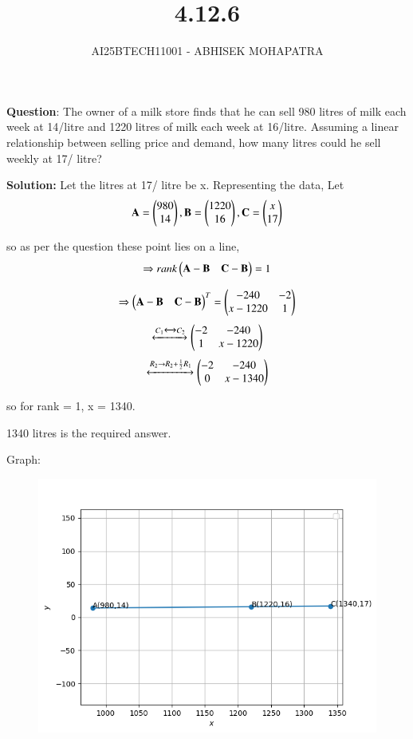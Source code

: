 \documentclass[journal,12pt,onecolumn]{IEEEtran}
\begin{document}
\title{4.12.6}
\author{AI25BTECH11001 - ABHISEK MOHAPATRA}
{\let\newpage\relax\maketitle}
	 	\textbf{Question}:
The owner of a milk store finds that he can sell 980 litres of milk each week
at 14/litre and 1220 litres of milk each week at 16/litre. Assuming a linear
relationship between selling price and demand, how many litres could he sell weekly
at 17/ litre?

		\textbf{Solution:} 
Let the litres at 17/ litre be x.
Representing the data, Let
\begin{align}
\mathbf{A} = \begin{pmatrix}980 \\ 14\end{pmatrix},
\mathbf{B} = \begin{pmatrix}1220 \\ 16\end{pmatrix},
\mathbf{C} = \begin{pmatrix}x \\ 17\end{pmatrix}
\end{align}

so as per the question these point lies on a line,
\begin{align}
	\Rightarrow rank\begin{pmatrix}\mathbf{A}-\mathbf{B} & \mathbf{C}-\mathbf{B}\end{pmatrix} = 1 
\end{align}

\begin{align}
	\Rightarrow \begin{pmatrix}\mathbf{A}-\mathbf{B} & \mathbf{C}-\mathbf{B}\end{pmatrix}^T = \begin{pmatrix}-240 & -2 \\ x-1220 & 1\end{pmatrix} 
\end{align}
\begin{align}
	\xleftrightarrow[]{C_1\xleftrightarrow[]{} C_2} \begin{pmatrix}-2 & -240 \\ 1 & x - 1220\end{pmatrix}
\end{align}
\begin{align}
	\xleftrightarrow[]{R_2\rightarrow R_2 + \frac{1}{2}R_1} \begin{pmatrix}-2 & -240 \\ 0 & x - 1340\end{pmatrix}
\end{align}

so for rank = 1, x = 1340.

1340 litres is the required answer.


Graph:
\begin{figure}[h!]
	\centering
	\includegraphics[width=0.7\linewidth]{fig1.png}
\end{figure}
\end{document}
